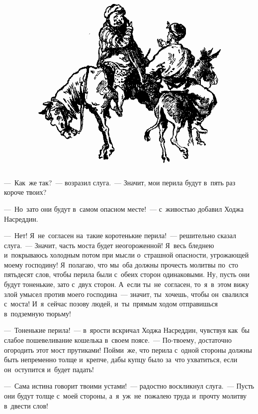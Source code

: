 \documentclass[12pt,a4paper]{book}
\begin{document}
\begin{figure}[h]
\centering
\includegraphics[width=\textwidth]{2.png}
\end{figure}

—~Как~же так?~— возразил слуга.~— Значит, мои перила будут в~пять раз короче твоих?

—~Но~зато они будут в~самом опасном месте!~— с~живостью добавил Ходжа Насреддин.

—~Нет! Я~не~согласен на~такие коротенькие перила!~— решительно сказал слуга.~— Значит, часть моста будет неогороженной! Я~весь бледнею и~покрываюсь холодным потом при мысли о~страшной опасности, угрожающей моему господину! Я~полагаю, что мы~оба должны прочесть молитвы по~сто пятьдесят слов, чтобы перила были с~обеих сторон одинаковыми. Ну, пусть они будут тоненькие, зато с~двух сторон. А~если ты~не~согласен, то~я~в~этом вижу злой умысел против моего господина~— значит, ты~хочешь, чтобы он~свалился с~моста! И~я~сейчас позову людей, и~ты~прямым ходом отправишься в~подземную тюрьму!

—~Тоненькие перила!~— в~ярости вскричал Ходжа Насреддин, чувствуя как~бы слабое пошевеливание кошелька в~своем поясе.~— По-твоему, достаточно огородить этот мост прутиками! Пойми~же, что перила с~одной стороны должны быть непременно толще и~крепче, дабы купцу было за~что ухватиться, если он~оступится и~будет падать!

—~Сама истина говорит твоими устами!~— радостно воскликнул слуга.~— Пусть они будут толще с~моей стороны, а~я~уж~не~пожалею труда и~прочту молитву в~двести слов!
\end{document}
